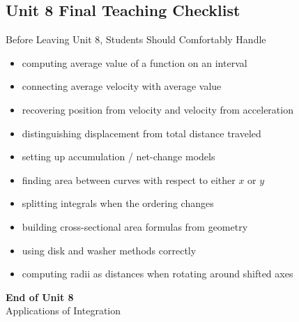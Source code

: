 \documentclass[11pt]{article}
\begin{document}
\newpage
\subsection{Unit 8 Final Teaching Checklist}

\begin{theorybox}{Before Leaving Unit 8, Students Should Comfortably Handle}
\begin{itemize}
    \item computing average value of a function on an interval
    \item connecting average velocity with average value
    \item recovering position from velocity and velocity from acceleration
    \item distinguishing displacement from total distance traveled
    \item setting up accumulation / net-change models
    \item finding area between curves with respect to either \(x\) or \(y\)
    \item splitting integrals when the ordering changes
    \item building cross-sectional area formulas from geometry
    \item using disk and washer methods correctly
    \item computing radii as distances when rotating around shifted axes
\end{itemize}
\end{theorybox}

\vfill
\begin{center}
{\Large\color{novelPurpleDark}\textbf{End of Unit 8}}\\[0.35em]
{\large Applications of Integration}
\end{center}
\end{document}
